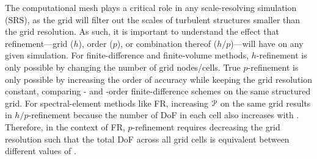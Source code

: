 

%


The computational mesh plays a critical role in any scale-resolving simulation
(SRS), as the grid will filter out the scales of turbulent structures smaller
than the grid resolution.
%
As such, it is important to understand the effect that refinement---grid ($h$),
order ($p$), or combination thereof ($h/p$)---will have on any given simulation.
%
For finite-difference and finite-volume methods, $h$-refinement is only possible
by changing the number of grid nodes\slash cells.
%
True $p$-refinement is only possible by increasing the order of accuracy while
keeping the grid resolution constant, \forexample comparing - and
-order finite-difference schemes on the same structured grid.
%
For spectral-element methods like FR, increasing ${\cal P}$ on the same grid
results in $h/p$-refinement because the number of DoF in each cell also
increases with \PO.
%
Therefore, in the context of FR, $p$-refinement requires decreasing the grid
resolution such that the total DoF across all grid cells is equivalent between
different values of \PO.

